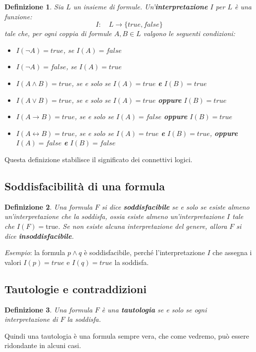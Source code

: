 \documentclass[a4paper,12pt]{report}
\newcommand{\tto} {\leftrightarrow}
\newtheorem{definition}{Definizione}[section]
\begin{document}
\begin{definition}
    Sia $L$ un insieme di formule. Un'\textbf{interpretazione} $I$ per $L$ è una funzione:
    \[
        I: \quad L \to \{true, false\}
    \]
    tale che, per ogni coppia di formule $A, B \in L$ valgono le seguenti condizioni:
    \begin{itemize}
        \item $I(\lnot A) = true$, se $I(A) = false$
        \item $I(\lnot A) = false$, se $I(A) = true$
        \item $I(A \land B) = true$, se e solo se $I(A) = true$ \textbf{e} $I(B) = true$
        \item $I(A \lor B) = true$, se e solo se $I(A) = true$ \textbf{oppure} $I(B) = true$
        \item $I(A \to B) = true$, se e solo se $I(A) = false$ \textbf{oppure} $I(B) = true$
        \item $I(A \tto B) = true$, se e solo se $I(A) = true$ \textbf{e} $I(B) = true$, \textbf{oppure} $I(A) = false$ \textbf{e} $I(B) = false$
    \end{itemize}
\end{definition}
Questa definizione stabilisce il significato dei connettivi logici.

\subsection{Soddisfacibilità di una formula}
\begin{definition}
    Una formula $F$ si dice \textbf{soddisfacibile} se e solo se esiste almeno un'interpretazione che la soddisfa, ossia esiste almeno un'interpretazione $I$ tale che $I(F) = \text{true}$. Se non esiste alcuna interpretazione del genere, allora $F$ si dice \textbf{insoddisfacibile}.
\end{definition}
\emph{Esempio}: la formula $p \land q$ è soddisfacibile, perché l'interpretazione $I$ che assegna i valori $I(p) = true$ e $I(q) = true$ la soddisfa.

\subsection{Tautologie e contraddizioni}
\label{taut-contr}
\begin{definition}
    Una formula $F$ è una \textbf{tautologia} se e solo se ogni interpretazione di $F$ la soddisfa.
\end{definition}
Quindi una tautologia è una formula sempre vera, che come vedremo, può essere ridondante in alcuni casi.
\end{document}
